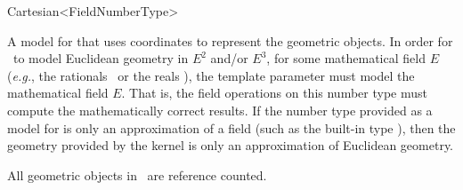 \begin{ccRefClass}{Cartesian<FieldNumberType>}

\ccDefinition
A model for  that uses  coordinates to represent the
geometric objects.  In order for \ccRefName\ to model Euclidean geometry
in $E^2$ and/or $E^3$, for some mathematical field $E$ (\textit{e.g.},
the rationals \Q\ or the reals \R), the template parameter  
must model the mathematical field $E$.  That is, the field operations on this
number type must compute the mathematically correct results.  If the number 
type provided as a model for  is only an approximation of a 
field (such as the built-in type ), then the geometry provided by 
the kernel is only an approximation of Euclidean geometry.  

\ccIsModel
{}

\ccTypes
{}
\ccGlue
{}

\ccImplementation
All geometric objects in \ccRefName\ are reference counted.

\ccSeeAlso
{}  \\
 \\
 \\

\end{ccRefClass}
